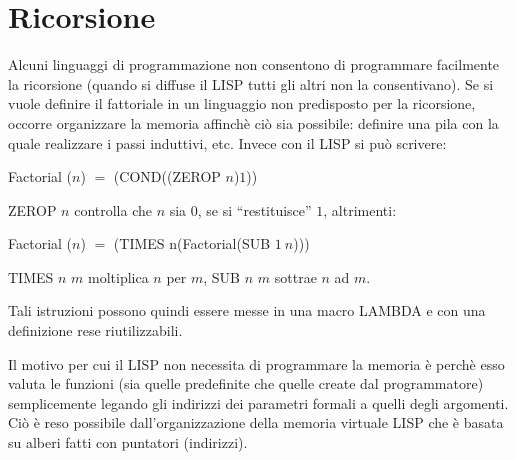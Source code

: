 \documentclass{book}
\begin{document}
\section{Ricorsione}
Alcuni linguaggi di programmazione non consentono di programmare facilmente la 
ricorsione (quando si diffuse il LISP tutti gli altri non la consentivano). Se 
si vuole definire il fattoriale in un linguaggio non predisposto per la 
ricorsione, occorre organizzare la memoria affinch\`e ci\`o sia possibile: 
definire una pila con la quale realizzare i passi induttivi, etc. Invece con il
LISP si pu\`o scrivere: 
\begin{center}
Factorial ($n$) $=$ (COND((ZEROP $n$)$1$))
\end{center} 
ZEROP $n$ controlla che $n$ sia $0$, se si ``restituisce'' $1$, altrimenti:
\begin{center}
Factorial ($n$) $=$ (TIMES n(Factorial(SUB $1 \ n$)))
\end{center} 
TIMES $n$ $m$ moltiplica $n$ per $m$, SUB $n$ $m$ sottrae $n$ ad $m$.

Tali istruzioni possono quindi essere messe in una macro LAMBDA e con una 
definizione rese riutilizzabili.

Il motivo per cui il LISP non necessita di programmare la memoria \`e perch\`e
esso valuta le funzioni (sia quelle predefinite che quelle create dal 
programmatore) semplicemente legando gli indirizzi dei parametri formali a 
quelli degli argomenti. Ci\`o \`e reso possibile dall'organizzazione della 
memoria virtuale LISP che \`e basata su alberi fatti con puntatori (indirizzi).
\end{document}
